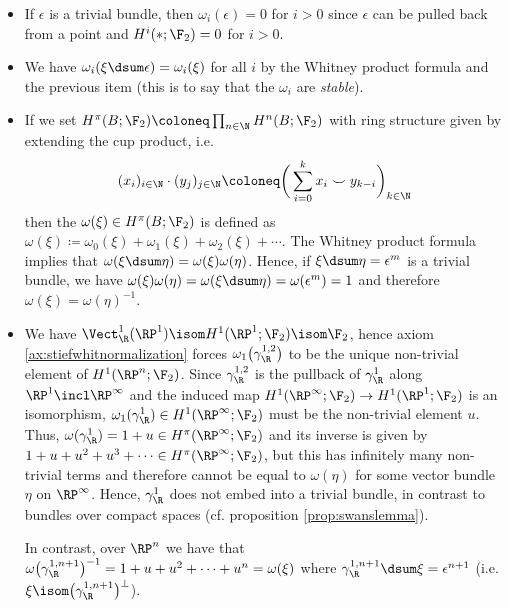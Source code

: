 \begin{itemize}
	\item If $\epsilon$ is a trivial bundle, then $\omega_i(\epsilon) = 0$ for $i > 0$ since $\epsilon$ can be pulled back from a point and $H^i({{*}}; \F_2) = 0$ for $i > 0$.
	\item We have $\omega_i(\xi \dsum \epsilon) = \omega_i(\xi)$ for all $i$ by the Whitney product formula and the previous item (this is to say that the $\omega_i$ are \emph{stable}).
	\item If we set $H^\pi(B; \F_2) \coloneq \prod_{n \in \N} H^n(B; \F_2)$ with ring structure given by extending the cup product, i.e.
		\begin{equation*}
			(x_i)_{i \in \N} \cdot (y_j)_{j \in \N} \coloneq \bigg(\sum_{i = 0}^k x_i \smile y_{k - i}\bigg)_{k \in \N}
		\end{equation*}
		then the  $\omega(\xi) \in H^\pi(B; \F_2)$ is defined as $\omega(\xi) \coloneq \omega_0(\xi) + \omega_1(\xi) + \omega_2(\xi) + \cdots$.
		The Whitney product formula implies that  $\omega(\xi \dsum \eta) = \omega(\xi) \omega(\eta)$.
		Hence, if $\xi \dsum \eta = \epsilon^m$ is a trivial bundle, we have $\omega(\xi) \omega(\eta) = \omega(\xi \dsum \eta) = \omega(\epsilon^m) = 1$ and therefore $\omega(\xi) = \omega(\eta)^{-1}$.
	\item We have $\Vect_{\R}^1(\RP^1) \isom H^1(\RP^1; \F_2) \isom \F_2$, hence axiom \ref{ax:stiefwhitnormalization} forces $\omega_1\big(\gamma_{\R}^{1, 2}\big)$ to be the unique non-trivial element of $H^1(\RP^n; \F_2)$.
		Since $\gamma_{\R}^{1, 2}$ is the pullback of $\gamma_{\R}^1$ along $\RP^1 \incl \RP^\infty$ and the induced map $H^1(\RP^\infty; \F_2) \to H^1(\RP^1; \F_2)$ is an isomorphism, $\omega_1(\gamma_{\R}^1) \in H^1(\RP^\infty; \F_2)$ must be the non-trivial element $u$.
		Thus, $\omega(\gamma_{\R}^1) = 1 + u \in H^\pi(\RP^\infty; \F_2)$ and its inverse is given by $1 + u + u^2 + u^3 + \cdots \in H^\pi(\RP^\infty; \F_2)$, but this has infinitely many non-trivial terms and therefore cannot be equal to $\omega(\eta)$ for some vector bundle $\eta$ on $\RP^\infty$.
		Hence, $\gamma_{\R}^1$ does not embed into a trivial bundle, in contrast to bundles over compact spaces (cf. proposition \ref{prop:swanslemma}).

		In contrast, over $\RP^n$ we have that $\omega\big(\gamma_{\R}^{1, n + 1}\big)^{-1} = 1 + u + u^2 + \cdots + u^n = \omega(\xi)$ where $\gamma_{\R}^{1, n + 1} \dsum \xi = \epsilon^{n + 1}$ (i.e. $\xi \isom \big(\gamma_{\R}^{1, n + 1}\big)^\perp$).
\end{itemize}

